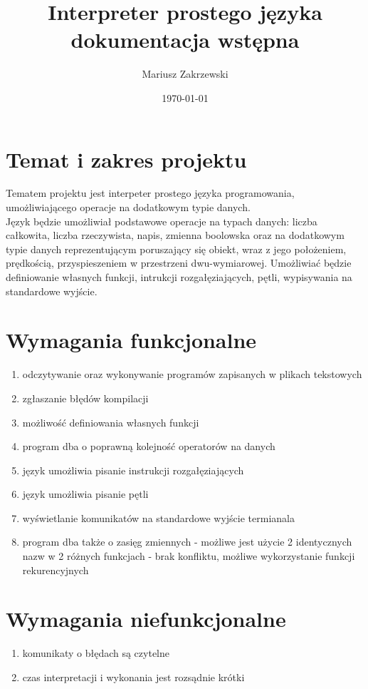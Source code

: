 \documentclass[12pt]{article}
\title{Interpreter prostego języka\\ \large dokumentacja wstępna}
\author{
        Mariusz Zakrzewski
}
\date{\today}
\begin{document}
\maketitle

\section{Temat i zakres projektu}

Tematem projektu jest interpeter prostego języka programowania, umożliwiającego operacje na dodatkowym typie danych. \\

Język będzie umożliwiał podstawowe operacje na typach danych: liczba całkowita, liczba rzeczywista, napis, zmienna boolowska oraz na dodatkowym 
typie danych reprezentującym poruszający się obiekt, wraz z jego położeniem, prędkością, przyspieszeniem w przestrzeni dwu-wymiarowej. Umożliwiać będzie definiowanie 
własnych funkcji, intrukcji rozgałęziających, pętli, wypisywania na standardowe wyjście.

\section{Wymagania funkcjonalne}
\begin{enumerate}
\item odczytywanie oraz wykonywanie programów zapisanych w plikach tekstowych
\item zgłaszanie błędów kompilacji
\item możliwość definiowania własnych funkcji
\item program dba o poprawną kolejność operatorów na danych
\item język umożliwia pisanie instrukcji rozgałęziających
\item język umożliwia pisanie pętli
\item wyświetlanie komunikatów na standardowe wyjście termianala
\item program dba także o zasięg zmiennych - możliwe jest użycie 2 identycznych nazw w 2 różnych funkcjach - brak konfliktu, możliwe wykorzystanie funkcji rekurencyjnych
\end{enumerate}
\section{Wymagania niefunkcjonalne}
\begin{enumerate}
\item komunikaty o błędach są czytelne
\item czas interpretacji i wykonania jest rozsądnie krótki
\end{enumerate}
\end{document}
